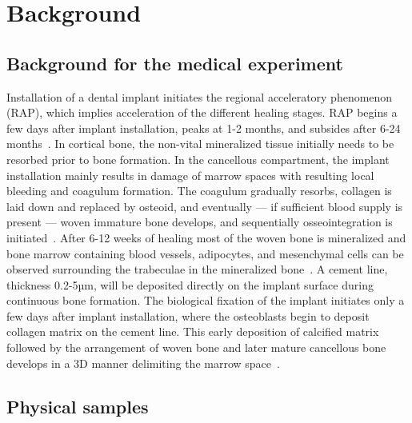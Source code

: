 \section{Background}
\label{sec:background}


\subsection{Background for the medical experiment} Installation of a dental implant initiates the
regional acceleratory phenomenon (RAP), which implies acceleration of the different healing stages.
RAP begins a few days after implant installation, peaks at 1-2 months, and subsides after 6-24
months~\cite{frost1989}. In cortical bone, the non-vital mineralized tissue initially needs to be
resorbed prior to bone formation. In the cancellous compartment, the implant installation mainly
results in damage of marrow spaces with resulting local bleeding and coagulum formation. The
coagulum gradually resorbs, collagen is laid down and replaced by osteoid, and eventually --- if
sufficient blood supply is present --- woven immature bone develops, and sequentially
osseointegration is initiated~\cite{frost1989}. After 6-12 weeks of healing most of the woven bone
is mineralized and bone marrow containing blood vessels, adipocytes, and mesenchymal cells can be
observed surrounding the trabeculae in the mineralized bone~\cite{Berglundh2003, Abrahamsson2004}.
A cement line, thickness  0.2-5µm, will be deposited directly on the implant surface during
continuous bone formation. The biological fixation of the implant initiates only a few days after
implant installation, where the osteoblasts begin to deposit collagen matrix on the cement line.
This early deposition of calcified matrix followed by the arrangement of woven bone and later mature
cancellous bone develops in a 3D manner delimiting the marrow space~\cite{Franchi2004}.

\subsection{Physical samples}

